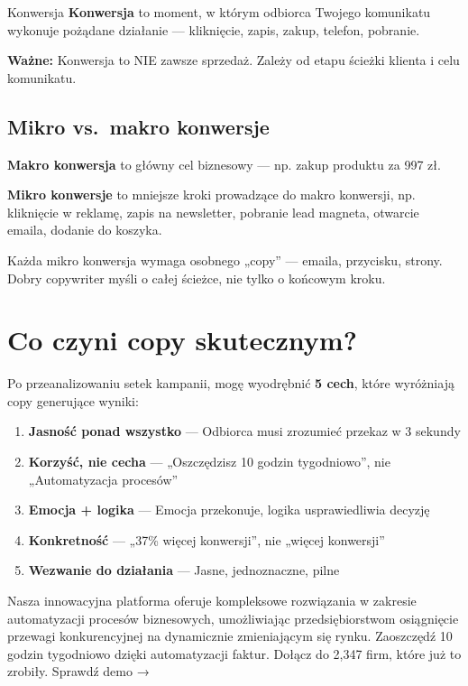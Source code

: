 \documentclass[
  12pt,
  a4paper,
  twoside,
  openright,
  12pt,
  DIV=12,
  BCOR=12mm]{scrbook}
\providecommand{\tightlist}{%
  \setlength{\itemsep}{0pt}\setlength{\parskip}{0pt}}\usepackage{longtable,booktabs,array}
\begin{document}
\begin{pojecie}{Konwersja}
\textbf{Konwersja} to moment, w którym odbiorca Twojego komunikatu wykonuje pożądane działanie --- kliknięcie, zapis, zakup, telefon, pobranie.

\medskip
\textbf{Ważne:} Konwersja to NIE zawsze sprzedaż. Zależy od etapu ścieżki klienta i celu komunikatu.
\end{pojecie}

\subsection{Mikro vs.~makro konwersje}\label{mikro-vs.-makro-konwersje}

\textbf{Makro konwersja} to główny cel biznesowy --- np. zakup produktu
za 997 zł.

\textbf{Mikro konwersje} to mniejsze kroki prowadzące do makro
konwersji, np. kliknięcie w reklamę, zapis na newsletter, pobranie lead
magneta, otwarcie emaila, dodanie do koszyka.

Każda mikro konwersja wymaga osobnego „copy'' --- emaila, przycisku,
strony. Dobry copywriter myśli o całej ścieżce, nie tylko o końcowym
kroku.

\section{Co czyni copy skutecznym?}\label{co-czyni-copy-skutecznym}

Po przeanalizowaniu setek kampanii, mogę wyodrębnić \textbf{5 cech},
które wyróżniają copy generujące wyniki:

\begin{enumerate}
\def\labelenumi{\arabic{enumi}.}
\tightlist
\item
  \textbf{Jasność ponad wszystko} --- Odbiorca musi zrozumieć przekaz w
  3 sekundy
\item
  \textbf{Korzyść, nie cecha} --- „Oszczędzisz 10 godzin tygodniowo'',
  nie „Automatyzacja procesów''
\item
  \textbf{Emocja + logika} --- Emocja przekonuje, logika usprawiedliwia
  decyzję
\item
  \textbf{Konkretność} --- „37\% więcej konwersji'', nie „więcej
  konwersji''
\item
  \textbf{Wezwanie do działania} --- Jasne, jednoznaczne, pilne
\end{enumerate}

\begin{beforeafter}
{Nasza innowacyjna platforma oferuje kompleksowe rozwiązania w zakresie automatyzacji procesów biznesowych, umożliwiając przedsiębiorstwom osiągnięcie przewagi konkurencyjnej na dynamicznie zmieniającym się rynku.}
{Zaoszczędź 10 godzin tygodniowo dzięki automatyzacji faktur. Dołącz do 2,347 firm, które już to zrobiły. Sprawdź demo →}
\end{beforeafter}
\end{document}
